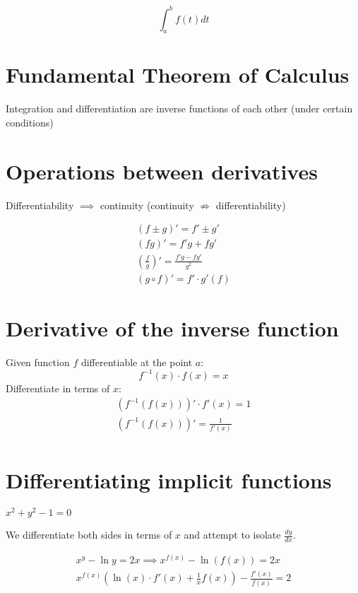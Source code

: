 \documentclass[00_complete]{subfiles}
\begin{document}
$$\int_{a}^{b}f(t)dt$$

\section{Fundamental Theorem of Calculus}

Integration and differentiation are inverse functions of each other (under
certain conditions)

\section{Operations between derivatives}

\begin{note}
        Differentiability $\implies$ continuity
        (continuity $\nRightarrow$ differentiability)
\end{note}

\begin{gather}
    (f \pm g)' = f' \pm g' \\
    (fg)' = f'g+fg' \\
    \left(\frac{f}{g}\right)' = \frac{f'g-fg'}{g^2} \\
    (g \circ f)' = f' \cdot g'(f)
\end{gather}

\section{Derivative of the inverse function}

Given function $f$ differentiable at the point $a$:
\[
    f^{-1}(x) \cdot f(x) = x
\]
Differentiate in terms of $x$:
\[
\begin{gathered}
    (f^{-1}(f(x)))'\cdot f'(x) = 1 \\
    (f^{-1}(f(x)))' = \frac{1}{f'(x)} \\
\end{gathered}
\]

\section{Differentiating implicit functions}

\begin{example}
    $x^2+y^2-1=0$
\end{example}

We differentiate both sides in terms of $x$ and attempt to isolate $\frac{dy}{dx}$.

\[
    \begin{gathered}
        x^y-\ln y = 2x \implies x^{f(x)} - \ln(f(x))=2x \\
        x^{f(x)}\left(\ln(x)\cdot f'(x)+\frac{1}{x}f(x)\right) - \frac{f'(x)}{f(x)}=2
    \end{gathered}
\]
\end{document}
